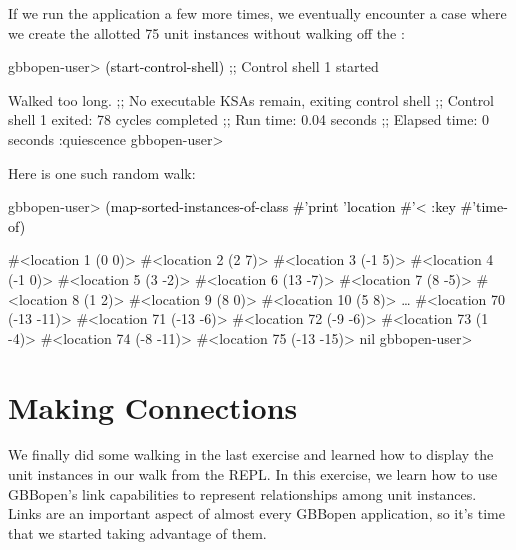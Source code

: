 \documentclass[10pt,twoside,english,pdftex]{article}
\begin{document}
%
%
If we run the application a few more times, we eventually encounter a case
where we create the allotted 75  unit instances without
walking off the :
%
\W\supp
\begin{example}
\textcolor{darkergray}{%
  gbbopen-user> \textcolor{black}{(start-control-shell)}
  ;; Control shell 1 started

  Walked too long.
  ;; No executable KSAs remain, exiting control shell
  ;; Control shell 1 exited: 78 cycles completed
  ;; Run time: 0.04 seconds
  ;; Elapsed time: 0 seconds
  :quiescence
  gbbopen-user>}
\end{example}

%
Here is one such random walk:
%
\W\supp
\begin{example}
\textcolor{darkergray}{%
  gbbopen-user> \textcolor{black}{(map-sorted-instances-of-class #'print 'location #'< 
                   :key #'time-of)}

  #<location 1 (0 0)> 
  #<location 2 (2 7)> 
  #<location 3 (-1 5)> 
  #<location 4 (-1 0)> 
  #<location 5 (3 -2)> 
  #<location 6 (13 -7)> 
  #<location 7 (8 -5)> 
  #<location 8 (1 2)> 
  #<location 9 (8 0)> 
  #<location 10 (5 8)> 
     \textrm{\ldots{}}
  #<location 70 (-13 -11)> 
  #<location 71 (-13 -6)> 
  #<location 72 (-9 -6)> 
  #<location 73 (1 -4)> 
  #<location 74 (-8 -11)> 
  #<location 75 (-13 -15)> 
  nil
  gbbopen-user>}
\end{example}


\T\markright{}%
\T\pagestyle{plain}
\T\cleardoublepage
\W{}
\T\pagestyle{fancy}
\T\thispagestyle{fancybottom}
\T\renewcommand{\headrulewidth}{0pt}
\section{Making Connections}
\label{sec:connections}%


We finally did some walking in the last exercise and learned how to display
the  unit instances in our walk from the REPL.  In this
exercise, we learn how to use GBBopen's link capabilities to represent
relationships among unit instances.  Links are an important aspect of almost
every GBBopen application, so it's time that we started taking advantage of
them.
\end{document}
